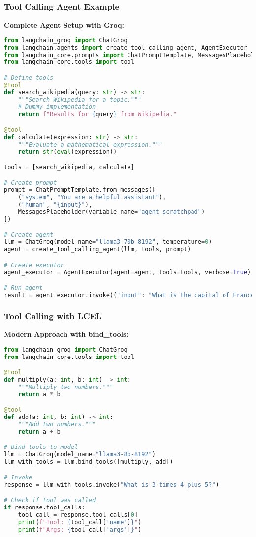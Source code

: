 \begin{frame}[fragile]\frametitle{Tool Calling Agent Example}

\textbf{Complete Agent Setup with Groq:}
\begin{lstlisting}[language=python, basicstyle=\tiny]
from langchain_groq import ChatGroq
from langchain.agents import create_tool_calling_agent, AgentExecutor
from langchain_core.prompts import ChatPromptTemplate, MessagesPlaceholder
from langchain_core.tools import tool

# Define tools
@tool
def search_wikipedia(query: str) -> str:
    """Search Wikipedia for a topic."""
    # Dummy implementation
    return f"Results for {query} from Wikipedia."

@tool
def calculate(expression: str) -> str:
    """Evaluate a mathematical expression."""
    return str(eval(expression))

tools = [search_wikipedia, calculate]

# Create prompt
prompt = ChatPromptTemplate.from_messages([
    ("system", "You are a helpful assistant"),
    ("human", "{input}"),
    MessagesPlaceholder(variable_name="agent_scratchpad")
])

# Create agent
llm = ChatGroq(model_name="llama3-70b-8192", temperature=0)
agent = create_tool_calling_agent(llm, tools, prompt)

# Create executor
agent_executor = AgentExecutor(agent=agent, tools=tools, verbose=True)

# Run agent
result = agent_executor.invoke({"input": "What is the capital of France?"})
\end{lstlisting}

\end{frame}

\begin{frame}[fragile]\frametitle{Tool Calling with LCEL}

\textbf{Modern Approach with bind\_tools:}
\begin{lstlisting}[language=python, basicstyle=\tiny]
from langchain_groq import ChatGroq
from langchain_core.tools import tool

@tool
def multiply(a: int, b: int) -> int:
    """Multiply two numbers."""
    return a * b

@tool  
def add(a: int, b: int) -> int:
    """Add two numbers."""
    return a + b

# Bind tools to model
llm = ChatGroq(model_name="llama3-8b-8192")
llm_with_tools = llm.bind_tools([multiply, add])

# Invoke
response = llm_with_tools.invoke("What is 3 times 4 plus 5?")

# Check if tool was called
if response.tool_calls:
    tool_call = response.tool_calls[0]
    print(f"Tool: {tool_call['name']}")
    print(f"Args: {tool_call['args']}")
\end{lstlisting}

\end{frame}

